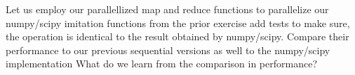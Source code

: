 \documentclass[]{erlangen-problemset}
\begin{document}
\begin{problem}[title={Parallel numpy/scipy replacement}]
\noindent
\Question Let us employ our parallellized map and reduce functions to parallelize our numpy/scipy imitation functions from the prior exercise
\Question add tests to make sure, the operation is identical to the result obtained by numpy/scipy.
\Question Compare their performance to our previous sequential versions as well to the numpy/scipy implementation
\Question What do we learn from the comparison in performance?
\end{problem}
\end{document}
